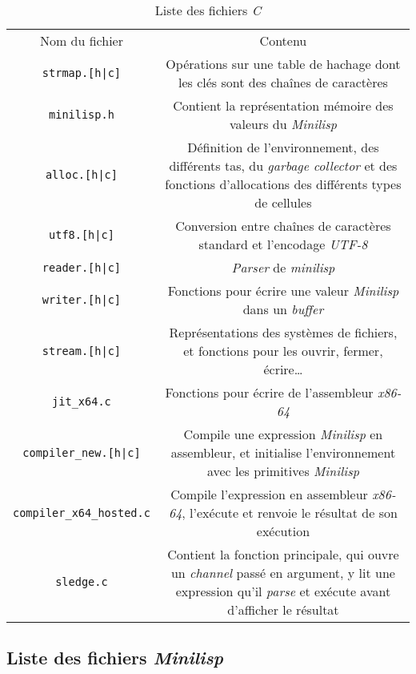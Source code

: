 \documentclass[a4paper, 10pt, french]{article}
\newcommand{\code}[1]{\texttt{#1}}
\newcommand{\foreign}[1]{\emph{#1}}
\begin{document}
\begin{table}[H]
  \centering
  \begin{tabularx}{\linewidth}{|C|C|}
    \hline
    Nom du fichier & Contenu \tabularnewline
    \hhline{|=|=|}
    \code{strmap.[h|c]} & Opérations sur une table de hachage dont les clés sont des chaînes de caractères \tabularnewline
    \hhline{|=|=|}
    \code{minilisp.h} & Contient la représentation mémoire des valeurs du \foreign{Minilisp} \tabularnewline
    \hhline{|=|=|}
    \code{alloc.[h|c]} & Définition de l'environnement, des différents tas, du \foreign{garbage collector} et des fonctions d'allocations des différents types de cellules \tabularnewline
    \hhline{|=|=|}
    \code{utf8.[h|c]} & Conversion entre chaînes de caractères standard et l'encodage \foreign{UTF-8} \tabularnewline
    \hline
    \code{reader.[h|c]} & \foreign{Parser} de \foreign{minilisp} \tabularnewline
    \hline
    \code{writer.[h|c]} & Fonctions pour écrire une valeur \foreign{Minilisp} dans un \foreign{buffer} \tabularnewline
    \hline
    \code{stream.[h|c]} & Représentations des systèmes de fichiers, et fonctions pour les ouvrir, fermer, écrire\ldots \tabularnewline
    \hhline{|=|=|}
    \code{jit\_x64.c} & Fonctions pour écrire de l'assembleur \foreign{x86-64} \tabularnewline
    \hline
    \code{compiler\_new.[h|c]} & Compile une expression \foreign{Minilisp} en assembleur, et initialise l'environnement avec les primitives \foreign{Minilisp} \tabularnewline
    \hline
    \code{compiler\_x64\_hosted.c} & Compile l'expression en assembleur \foreign{x86-64}, l'exécute et renvoie le résultat de son exécution \tabularnewline
    \hhline{|=|=|}
    \code{sledge.c} & Contient la fonction principale, qui ouvre un \foreign{channel} passé en argument, y lit une expression qu'il \foreign{parse} et exécute avant d'afficher le résultat \tabularnewline
    \hline
  \end{tabularx}
  \caption{Liste des fichiers \foreign{C}}
\end{table}

\subsection{Liste des fichiers \foreign{Minilisp}}
\end{document}

